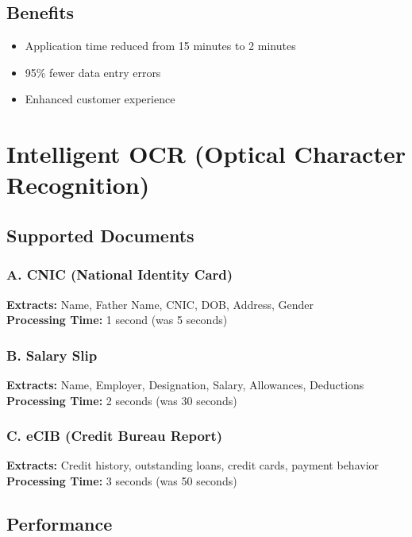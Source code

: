\documentclass[11pt,a4paper]{article}
\begin{document}
\subsection{Benefits}
\begin{itemize}[leftmargin=*]
    \item Application time reduced from 15 minutes to 2 minutes
    \item 95\% fewer data entry errors
    \item Enhanced customer experience
\end{itemize}

\newpage

\section{Intelligent OCR (Optical Character Recognition)}

\subsection{Supported Documents}

\subsubsection{A. CNIC (National Identity Card)}
\textbf{Extracts:} Name, Father Name, CNIC, DOB, Address, Gender\\
\textbf{Processing Time:} 1 second (was 5 seconds)

\subsubsection{B. Salary Slip}
\textbf{Extracts:} Name, Employer, Designation, Salary, Allowances, Deductions\\
\textbf{Processing Time:} 2 seconds (was 30 seconds)

\subsubsection{C. eCIB (Credit Bureau Report)}
\textbf{Extracts:} Credit history, outstanding loans, credit cards, payment behavior\\
\textbf{Processing Time:} 3 seconds (was 50 seconds)

\subsection{Performance}
\end{document}
